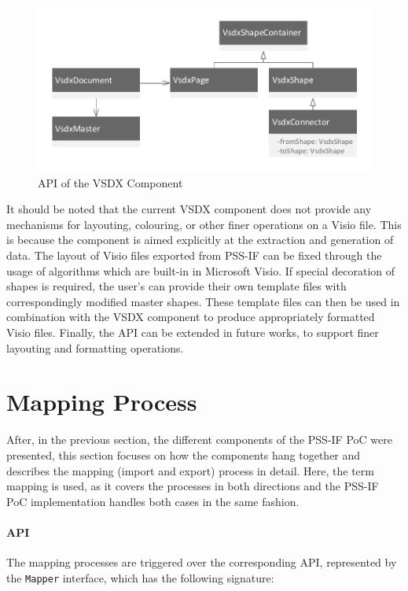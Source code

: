\begin{figure}[h]
\centering
\includegraphics[scale=0.75]{figures/visio.pdf}
\caption{API of the VSDX Component}
\label{fig:vsdxapi}
\end{figure}

It should be noted that the current VSDX component does not provide any mechanisms for layouting, colouring, or other finer operations on a Visio file. This is because the component is aimed explicitly at the extraction and generation of data. The layout of Visio files exported from PSS-IF can be fixed through the usage of algorithms which are built-in in Microsoft Visio. If special decoration of shapes is required, the user's can provide their own template files with correspondingly modified master shapes. These template files can then be used in combination with the VSDX component to produce appropriately formatted Visio files. Finally, the API can be extended in future works, to support finer layouting and formatting operations.

\section{Mapping Process}
\label{sec:impl:process}

After, in the previous section, the different components of the PSS-IF PoC were presented, this section focuses on how the components hang together and describes the mapping (import and export) process in detail. Here, the term mapping is used, as it covers the processes in both directions and the PSS-IF PoC implementation handles both cases in the same fashion.

\paragraph{API} The mapping processes are triggered over the corresponding API, represented by the \texttt{Mapper} interface, which has the following signature:

